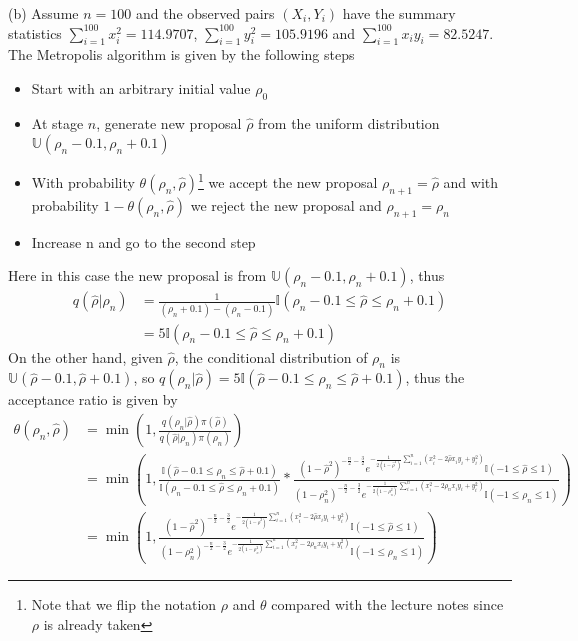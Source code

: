 \documentclass{homeworg}
\begin{document}
(b) Assume $n=100$ and the observed pairs $(X_i,Y_i)$ have the summary statistics $\sum_{i=1}^{100}x_i^2=114.9707$,  $\sum_{i=1}^{100} y_i^2=105.9196$ and $\sum_{i=1}^{100}x_iy_i=82.5247$.
The Metropolis algorithm is given by the following steps 
\begin{itemize}
\item Start with an arbitrary initial value $\rho_0$
\item At stage $n$, generate new proposal $\hat{\rho}$ from the uniform distribution $\mathbb{U}(\rho_n-0.1,\rho_n+0.1)$
\item With probability $\theta(\rho_n,\hat{\rho})$\footnote{Note that we flip the notation $\rho$ and $\theta$ compared with the lecture notes since $\rho$ is already taken} we accept the new proposal $\rho_{n+1}=\hat{\rho}$ and with probability $1-\theta(\rho_n,\hat{\rho})$ we reject the new proposal and $\rho_{n+1}=\rho_{n}$
\item Increase n and go to the second step
\end{itemize}
Here in this case the new proposal is from $\mathbb{U}(\rho_n-0.1,\rho_n+0.1)$, thus 
\begin{align*}
q(\hat{\rho}|\rho_n)&=\frac{1}{(\rho_n+0.1)-(\rho_n-0.1)}\mathbb{I}(\rho_n-0.1\leq \hat{\rho}\leq \rho_n+0.1)\\
&=5\mathbb{I}(\rho_n-0.1\leq \hat{\rho}\leq \rho_n+0.1)
\end{align*}
On the other hand, given $\hat{\rho}$, the conditional distribution of $\rho_n$ is $\mathbb{U}(\hat{\rho}-0.1,\hat{\rho}+0.1)$, so $q(\rho_n|\hat{\rho})=5\mathbb{I}(\hat{\rho}-0.1\leq \rho_n\leq \hat{\rho}+0.1)$, thus the acceptance ratio is given by 
\begin{align*}
\theta(\rho_n,\hat{\rho})&=\min(1,\frac{q(\rho_n|\hat{\rho})\pi(\hat{\rho})}{q(\hat{\rho}|\rho_n)\pi(\rho_n)})\\
&=\min(1,\frac{\mathbb{I}(\hat{\rho}-0.1\leq \rho_n\leq \hat{\rho}+0.1)}{\mathbb{I}(\rho_n-0.1\leq \hat{\rho}\leq \rho_n+0.1)}*\frac{(1-\hat{\rho}^2)^{-\frac{n}{2}-\frac{3}{2}}e^{-\frac{1}{2(1-\hat{\rho}^2)}\sum_{i=1}^{n}(x_i^2-2\hat{\rho} x_iy_i+y_i^2)} \mathbb{I}(-1\leq \hat{\rho} \leq 1)}{(1-\rho_n^2)^{-\frac{n}{2}-\frac{3}{2}}e^{-\frac{1}{2(1-\rho_n^2)}\sum_{i=1}^{n}(x_i^2-2\rho_n x_iy_i+y_i^2)} \mathbb{I}(-1\leq \rho_n \leq 1)})\\
&=\min(1,\frac{(1-\hat{\rho}^2)^{-\frac{n}{2}-\frac{3}{2}}e^{-\frac{1}{2(1-\hat{\rho}^2)}\sum_{i=1}^{n}(x_i^2-2\hat{\rho} x_iy_i+y_i^2)} \mathbb{I}(-1\leq \hat{\rho} \leq 1)}{(1-\rho_n^2)^{-\frac{n}{2}-\frac{3}{2}}e^{-\frac{1}{2(1-\rho_n^2)}\sum_{i=1}^{n}(x_i^2-2\rho_n x_iy_i+y_i^2)} \mathbb{I}(-1\leq \rho_n \leq 1)})
\end{align*}
\end{document}
